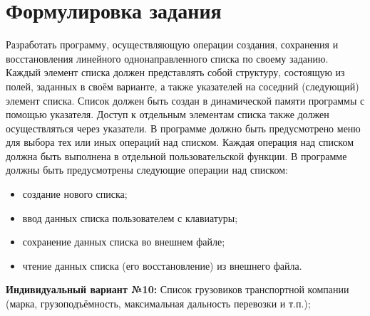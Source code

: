 \section*{Формулировка задания}

Разработать программу, осуществляющую операции создания,
сохранения и восстановления линейного однонаправленного списка по
своему заданию.
Каждый элемент списка должен представлять собой структуру,
состоящую из полей, заданных в своём варианте, а также указателей на
соседний (следующий) элемент списка.
Список должен быть создан в динамической памяти программы с
помощью указателя.
Доступ к отдельным элементам списка также должен
осуществляться через указатели.
В программе должно быть предусмотрено меню для выбора тех или
иных операций над списком.
Каждая операция над списком должна быть
выполнена в отдельной пользовательской функции.
В программе должны быть предусмотрены следующие операции над
списком:
\begin{itemize}
    \item создание нового списка;
    \item ввод данных списка пользователем с клавиатуры;
    \item сохранение данных списка во внешнем файле;
    \item чтение данных списка (его восстановление) из внешнего файла.
\end{itemize}

\textbf{Индивидуальный вариант №10:}
Список грузовиков транспортной компании (марка, грузоподъёмность,
максимальная дальность перевозки и
т.п.);
